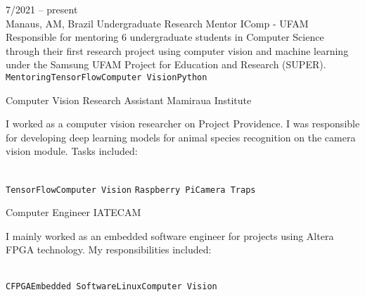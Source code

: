 \documentclass[10pt]{developercv} %
\begin{document}


\begin{entrylist}
  \entry
  {7/2021 -- present\\\footnotesize{Manaus, AM, Brazil}}
  {Undergraduate Research Mentor}
  {IComp - UFAM}
  {Responsible for mentoring 6 undergraduate students in Computer Science 
through their first research project using computer vision and machine learning 
under the Samsung UFAM Project for Education and Research (SUPER).\\ 
\texttt{Mentoring}\slashsep\texttt{TensorFlow}\slashsep\texttt{Computer 
Vision}\slashsep\texttt{Python}}

  {Computer Vision Research Assistant}
  {Mamiraua Institute}
  {
    I worked as a computer vision researcher on Project Providence. I was 
responsible for developing deep learning models for animal species recognition 
on the camera vision module. Tasks included:\\
    \begin{contributionlist}
    \end{contributionlist}\\
\texttt{TensorFlow}\slashsep\texttt{Computer Vision}
\slashsep\texttt {Raspberry Pi}\slashsep\texttt{Camera Traps}}
  
  {Computer Engineer}
  {IATECAM}
  {
    I mainly worked as an embedded software engineer for projects using Altera 
FPGA technology. My responsibilities included:\\
    \begin{contributionlist}
    \end{contributionlist}\\
    \texttt{C}\slashsep\texttt{FPGA}\slashsep\texttt{Embedded 
Software}\slashsep\texttt{Linux}\slashsep\texttt{Computer Vision}}
  

\end{entrylist}
\end{document}
